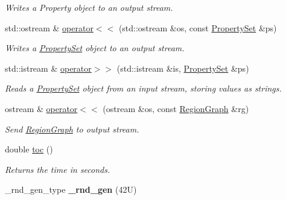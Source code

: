 \begin{CompactItemize}
\begin{CompactList}\small\item\em Writes a Property object to an output stream. \item\end{CompactList}\item 
\hypertarget{namespacedai_b339baefa9f588de2fba07526d8df7ba}{
std::ostream \& \hyperlink{namespacedai_b339baefa9f588de2fba07526d8df7ba}{operator$<$$<$} (std::ostream \&os, const \hyperlink{classdai_1_1PropertySet}{PropertySet} \&ps)}
\label{namespacedai_b339baefa9f588de2fba07526d8df7ba}

\begin{CompactList}\small\item\em Writes a \hyperlink{classdai_1_1PropertySet}{PropertySet} object to an output stream. \item\end{CompactList}\item 
\hypertarget{namespacedai_ab0479dd285fd4021ecaa80947d40da3}{
std::istream \& \hyperlink{namespacedai_ab0479dd285fd4021ecaa80947d40da3}{operator$>$$>$} (std::istream \&is, \hyperlink{classdai_1_1PropertySet}{PropertySet} \&ps)}
\label{namespacedai_ab0479dd285fd4021ecaa80947d40da3}

\begin{CompactList}\small\item\em Reads a \hyperlink{classdai_1_1PropertySet}{PropertySet} object from an input stream, storing values as strings. \item\end{CompactList}\item 
\hypertarget{namespacedai_0e910ae9247869ee549df8eed173a6df}{
ostream \& \hyperlink{namespacedai_0e910ae9247869ee549df8eed173a6df}{operator$<$$<$} (ostream \&os, const \hyperlink{classdai_1_1RegionGraph}{RegionGraph} \&rg)}
\label{namespacedai_0e910ae9247869ee549df8eed173a6df}

\begin{CompactList}\small\item\em Send \hyperlink{classdai_1_1RegionGraph}{RegionGraph} to output stream. \item\end{CompactList}\item 
\hypertarget{namespacedai_b27c0799ddef29bb3833477e32c53862}{
double \hyperlink{namespacedai_b27c0799ddef29bb3833477e32c53862}{toc} ()}
\label{namespacedai_b27c0799ddef29bb3833477e32c53862}

\begin{CompactList}\small\item\em Returns the time in seconds. \item\end{CompactList}\item 
\hypertarget{namespacedai_8676cd0faacaec12b2acf0e0472e3280}{
\_\-rnd\_\-gen\_\-type \textbf{\_\-rnd\_\-gen} (42U)}
\label{namespacedai_8676cd0faacaec12b2acf0e0472e3280}


\end{CompactItemize}
